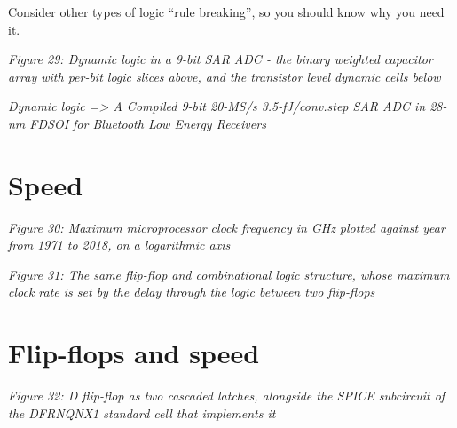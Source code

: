 Consider other types of logic ``rule breaking'', so you should know why
you need it.


{
\centering
{}
}

\emph{Figure 29: Dynamic logic in a 9-bit SAR ADC - the binary weighted
capacitor array with per-bit logic slices above, and the transistor
level dynamic cells below}

\emph{\emph{Dynamic logic =\textgreater{} A Compiled 9-bit 20-MS/s
3.5-fJ/conv.step SAR ADC in 28-nm FDSOI for Bluetooth Low Energy
Receivers }}

\section{Speed}\label{speed}


{
\centering
{}
}

\emph{Figure 30: Maximum microprocessor clock frequency in GHz plotted
against year from 1971 to 2018, on a logarithmic axis}


{
\centering
{}
}

\emph{Figure 31: The same flip-flop and combinational logic structure,
whose maximum clock rate is set by the delay through the logic between
two flip-flops}

\section{Flip-flops and speed}\label{flip-flops-and-speed}


{
\centering
{}
}

\emph{Figure 32: D flip-flop as two cascaded latches, alongside the
SPICE subcircuit of the DFRNQNX1 standard cell that implements it}

